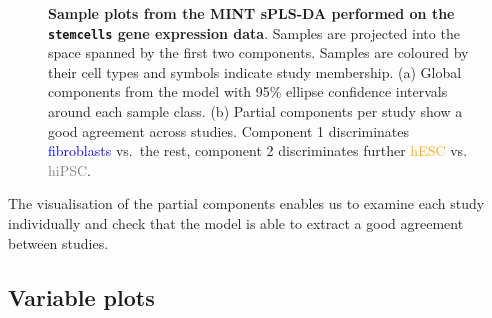 \documentclass[]{book}
\begin{document}
\begin{figure}

{\centering {}

}

\caption{\textbf{Sample plots from the MINT sPLS-DA performed on the \texttt{stemcells} gene expression data}. Samples are projected into the space spanned by the first two components. Samples are coloured by their cell types and symbols indicate study membership. (a) Global components from the model with 95\% ellipse confidence intervals around each sample class. (b) Partial components per study show a good agreement across studies. Component 1 discriminates \textcolor{blue}{fibroblasts} vs.~the rest, component 2 discriminates further \textcolor{orange}{hESC} vs. \textcolor{grey}{hiPSC}.}\label{fig:MINT-indiv}
\end{figure}



The visualisation of the partial components enables us to examine each study individually and check that the model is able to extract a good agreement between studies.

\hypertarget{mint:result:varplot}{%
\subsection{Variable plots}\label{mint:result:varplot}}
\end{document}
